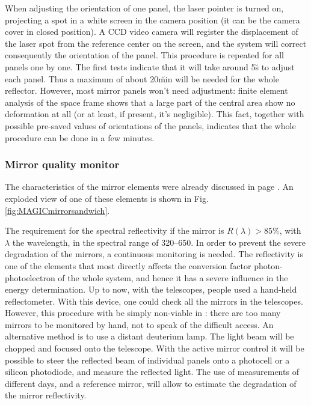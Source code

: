 When adjusting the orientation of one panel, the laser pointer is
turned on, projecting a spot in a white screen in the camera position
(it can be the camera cover in closed position). A CCD video camera
will register the displacement of the laser spot from the reference
center on the screen, and the system will correct consequently the
orientation of the panel. This procedure is repeated for all panels
one by one. The first tests \cite{MAGIC:Wacker_Kruger} indicate that
it will take around 5\u{s} to adjust each panel. Thus a maximum of
about 20\u{min} will be needed for the whole reflector. However, most
mirror panels won't need adjustment: finite element analysis of the
space frame shows that a large part of the central area show no
deformation at all (or at least, if present, it's negligible). This
fact, together with possible pre-saved values of orientations of the
panels, indicates that the whole procedure can be done in a few
minutes.


\subsubsection{Mirror quality monitor}
%
The characteristics of the mirror elements were already discussed in
page \pageref{label:mirrorelement}. An exploded view of one of these
elements is shown in Fig.  \ref{fig:MAGICmirrorsandwich}.

The requirement for the spectral reflectivity if the mirror is
$R(\lambda)>85\%$, with $\lambda$ the wavelength, in the spectral
range of 320--650. In order to prevent the severe degradation of the
mirrors, a continuous monitoring is needed. The reflectivity is one of
the elements that most directly affects the conversion factor
photon-photoelectron of the whole system, and hence it has a severe
influence in the energy determination. Up to now, with the \HEGRA
telescopes, people used a hand-held reflectometer. With this device,
one could check all the mirrors in the telescopes. However, this
procedure with be simply non-viable in \MAGIC: there are too many
mirrors to be monitored by hand, not to speak of the difficult access.
An alternative method is to use a distant deuterium lamp. The light
beam will be chopped and focused onto the telescope.  With the active
mirror control it will be possible to steer the reflected beam of
individual panels onto a photocell or a silicon photodiode, and
measure the reflected light. The use of measurements of different
days, and a reference mirror, will allow to estimate the degradation
of the mirror reflectivity.

